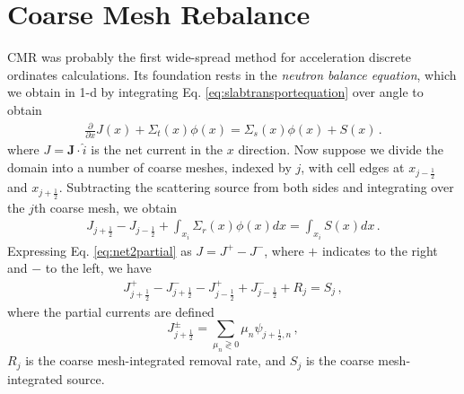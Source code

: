 \section*{Coarse Mesh Rebalance}

CMR was probably the first wide-spread method for acceleration discrete ordinates calculations.  Its foundation rests in the \textit{neutron balance equation}, which we obtain in 1-d by integrating Eq. \ref{eq:slabtransportequation} over angle to obtain
\begin{equation}
\begin{split}
 \frac{\partial }{\partial x}J(x) + \Sigma_t(x) \phi(x) = \Sigma_{s}(x)\phi(x) + S(x) \, .
\end{split}
\label{eq:balance}
\end{equation}
where $J = \mathbf{J}\cdot \hat{i}$ is the net current in the $x$ direction. Now suppose we divide the domain into a number of coarse meshes, indexed by $j$, with cell edges at $x_{j-\frac{1}{2}}$ and $x_{j+\frac{1}{2}}$.  Subtracting the scattering source from both sides and integrating over the $j$th coarse mesh, we obtain
\begin{equation}
\begin{split}
 J_{j+\frac{1}{2}} - J_{j-\frac{1}{2}}  + \int_{x_i} \Sigma_r(x) \phi(x) dx = \int_{x_i} S(x) dx \, .
\end{split}
\end{equation}
Expressing Eq. \ref{eq:net2partial} as $J = J^+ - J^-$, where $+$ indicates to the right and $-$ to the left, we have
\begin{equation}
\begin{split}
 J^+_{j+\frac{1}{2}}- J^-_{j+\frac{1}{2}} - J^+_{j-\frac{1}{2}} + J^-_{j-\frac{1}{2}} + R_j = S_j \, ,
\end{split}
\label{eq:cmrbalance}
\end{equation}
where the partial currents are defined
\begin{equation}
 J^{\pm}_{j+\frac{1}{2}} = \sum_{\mu_n \gtrless 0} \mu_n \psi_{j+\frac{1}{2},n} \, ,
\end{equation}
$R_j$ is the coarse mesh-integrated removal rate, and $S_j$ is the coarse mesh-integrated source.  

